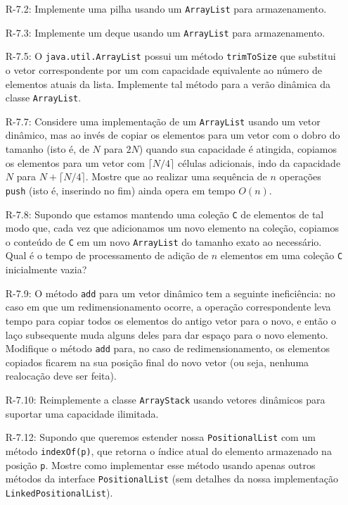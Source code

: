 \begin{enumerate}
\begin{itemize}
		\item[R-7.2:] Implemente uma pilha usando um \texttt{ArrayList} para armazenamento.
		
		\item[R-7.3:] Implemente um deque usando um \texttt{ArrayList} para armazenamento.
		
		\item[R-7.5:] O \texttt{java.util.ArrayList} possui um método \texttt{trimToSize} que substitui o vetor correspondente por um com capacidade equivalente ao número de elementos atuais da lista. Implemente tal método para a verão dinâmica da classe \texttt{ArrayList}.
		
		\item[R-7.7:] Considere uma implementação de um \texttt{ArrayList} usando um vetor dinâmico, mas ao invés de copiar os elementos para um vetor com o dobro do tamanho (isto é, de $N$ para $2N$) quando sua capacidade é atingida, copiamos os elementos para um vetor com $\lceil N/4 \rceil$ células adicionais, indo da capacidade $N$ para $N + \lceil N/4 \rceil$. Mostre que ao realizar uma sequência de $n$ operações \texttt{push} (isto é, inserindo no fim) ainda opera em tempo $O(n)$. 
		
		\item[R-7.8:] Supondo que estamos mantendo uma coleção \texttt{C} de elementos de tal modo que, cada vez que adicionamos um novo elemento na coleção, copiamos o conteúdo de \texttt{C} em um novo \texttt{ArrayList} do tamanho exato ao necessário. Qual é o tempo de processamento de adição de $n$ elementos em uma coleção \texttt{C} inicialmente vazia?
		
		\item[R-7.9:] O método \texttt{add} para um vetor dinâmico tem a seguinte ineficiência: no caso em que um redimensionamento ocorre, a operação correspondente leva tempo para copiar todos os elementos do antigo vetor para o novo, e então o laço subsequente muda alguns deles para dar espaço para o novo elemento. Modifique o método \texttt{add} para, no caso de redimensionamento, os elementos copiados ficarem na sua posição final do novo vetor (ou seja, nenhuma realocação deve ser feita).
		
		\item[R-7.10:] Reimplemente a classe \texttt{ArrayStack} usando vetores dinâmicos para suportar uma capacidade ilimitada.
		
		\item[R-7.12:] Supondo que queremos estender nossa \texttt{PositionalList} com um método \texttt{indexOf(p)}, que retorna o índice atual do elemento armazenado na posição \texttt{p}. Mostre como implementar esse método usando apenas outros métodos da interface \texttt{PositionalList} (sem detalhes da nossa implementação \texttt{LinkedPositionalList}).
		

\end{itemize}
\end{enumerate}

